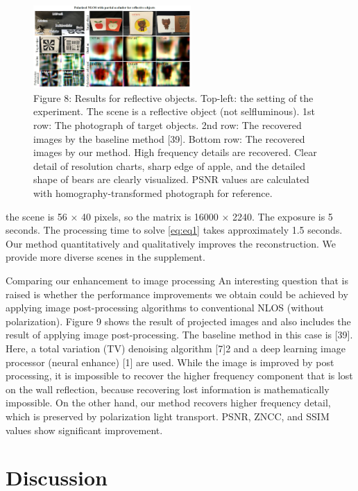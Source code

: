 \documentclass[10pt,twocolumn,letterpaper]{article}
\begin{document}
\begin{figure}[H]
    \centering
    \includegraphics[width=6cm]{image/image3.PNG}
    \caption{Figure 8: Results for reflective objects. Top-left: the setting of the experiment. The scene is a reflective object (not selfluminous).
1st row: The photograph of target objects. 2nd row: The recovered images by the baseline method [39]. Bottom
row: The recovered images by our method. High frequency details are recovered. Clear detail of resolution charts, sharp edge
of apple, and the detailed shape of bears are clearly visualized. PSNR values are calculated with homography-transformed
photograph for reference.}
    \label{fig:figure3}
\end{figure}

the scene is 56 × 40 pixels, so the matrix is 16000 × 2240.
The exposure is 5 seconds. The processing time to solve \cref{eq:eq1} takes approximately 1.5 seconds. Our method quantitatively
and qualitatively improves the reconstruction. We
provide more diverse scenes in the supplement.

Comparing our enhancement to image processing An
interesting question that is raised is whether the performance
improvements we obtain could be achieved by applying
image post-processing algorithms to conventional
NLOS (without polarization). Figure 9 shows the result of
projected images and also includes the result of applying
image post-processing. The baseline method in this case is
[39]. Here, a total variation (TV) denoising algorithm [7]2
and a deep learning image processor (neural enhance) [1]
are used. While the image is improved by post processing,
it is impossible to recover the higher frequency component
that is lost on the wall reflection, because recovering lost information
is mathematically impossible. On the other hand,
our method recovers higher frequency detail, which is preserved
by polarization light transport. PSNR, ZNCC, and SSIM values show significant improvement.

\section{\label{sec : Discussion} Discussion}
\end{document}
